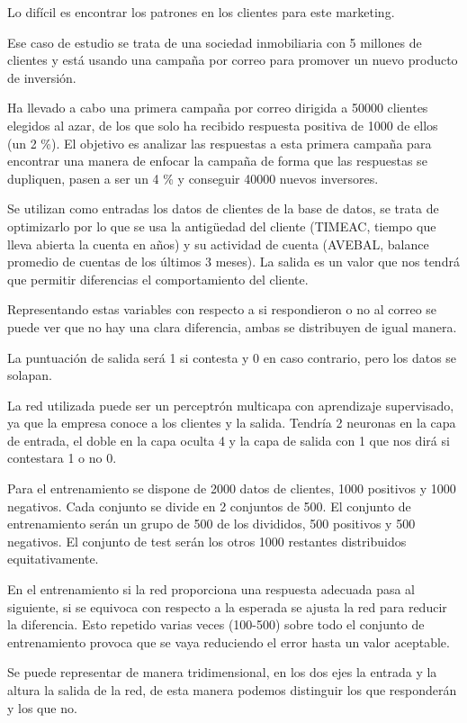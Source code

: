 \documentclass[12pt, twoside, openright]{report} %
\begin{document}
Lo difícil es encontrar los patrones en los clientes para este marketing.

Ese caso de estudio se trata de una sociedad inmobiliaria con 5 millones de clientes y está usando una campaña por correo para promover un nuevo producto de inversión.

Ha llevado a cabo una primera campaña por correo dirigida a 50000 clientes elegidos al azar, de los que solo ha recibido respuesta positiva de 1000 de ellos (un 2 \%). El objetivo es analizar las respuestas a esta primera campaña para encontrar una manera de enfocar la campaña de forma que las respuestas se dupliquen, pasen a ser un 4 \% y conseguir 40000 nuevos inversores.

Se utilizan como entradas los datos de clientes de la base de datos, se trata de optimizarlo por lo que se usa la antigüedad del cliente (TIMEAC, tiempo que lleva abierta la cuenta en años) y su actividad de cuenta (AVEBAL, balance promedio de cuentas de los últimos 3 meses). La salida es un valor que nos tendrá que permitir diferencias el comportamiento del cliente.

Representando estas variables con respecto a si respondieron o no al correo se puede ver que no hay una clara diferencia, ambas se distribuyen de igual manera.

La puntuación de salida será 1 si contesta y 0 en caso contrario, pero los datos se solapan.

La red utilizada puede ser un perceptrón multicapa con aprendizaje supervisado, ya que la empresa conoce a los clientes y la salida. Tendría 2 neuronas en la capa de entrada, el doble en la capa oculta 4 y la capa de salida con 1 que nos dirá si contestara 1 o no 0.

Para el entrenamiento se dispone de 2000 datos de clientes, 1000 positivos y 1000 negativos.  Cada conjunto se divide en 2 conjuntos de 500. El conjunto de entrenamiento serán un grupo de 500 de los divididos, 500 positivos y 500 negativos. El conjunto de test serán los otros 1000 restantes distribuidos equitativamente.

En el entrenamiento si la red proporciona una respuesta adecuada pasa al siguiente, si se equivoca con respecto a la esperada se ajusta la red para reducir la diferencia. Esto repetido varias veces (100-500) sobre todo el conjunto de entrenamiento provoca que se vaya reduciendo el error hasta un valor aceptable.

Se puede representar de manera tridimensional, en los dos ejes la entrada y la altura la salida de la red, de esta manera podemos distinguir los que responderán y los que no.
\end{document}
